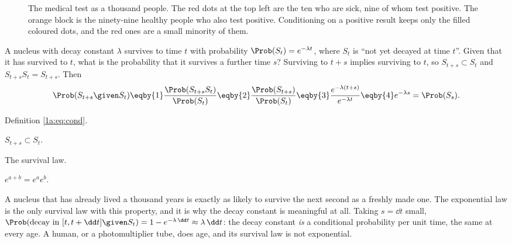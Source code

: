 \begin{figure}[htbp]
\centering
{}
\caption{The medical test as a thousand people. The red dots at the top left
are the ten who are sick, nine of whom test positive. The orange block is the
ninety-nine healthy people who also test positive. Conditioning on a positive
result keeps only the filled coloured dots, and the red ones are a small
minority of them.}
\label{1a:fig:dots}
\end{figure}

\label{1a:ex:nucleus}
A nucleus with decay constant $\lambda$ survives to time $t$ with probability
$\Prob(S_t)=e^{-\lambda t}$, where $S_t$ is ``not yet decayed at time $t$''. Given that
it has survived to $t$, what is the probability that it survives a further
time $s$? Surviving to $t+s$ implies surviving to $t$, so $S_{t+s}\subset S_t$ and
$S_{t+s}S_t=S_{t+s}$. Then
\begin{align*}
\Prob(S_{t+s}\given S_t)
\eqby{1}\frac{\Prob(S_{t+s}S_t)}{\Prob(S_t)}
\eqby{2}\frac{\Prob(S_{t+s})}{\Prob(S_t)}
\eqby{3}\frac{e^{-\lambda(t+s)}}{e^{-\lambda t}}
\eqby{4}e^{-\lambda s}=\Prob(S_s).
\end{align*}
\begin{explain}
  \item Definition \eqref{1a:eq:cond}.
  \item $S_{t+s}\subset S_t$.
  \item The survival law.
  \item $e^{a+b}=e^ae^b$.
\end{explain}
A nucleus that has already lived a thousand years is exactly as likely to
survive the next second as a freshly made one. The exponential law is the only
survival law with this  property, and it is why the decay
constant is meaningful at all. Taking $s=\dd t$ small,
$\Prob(\text{decay in }[t,t+\dd t]\given S_t)=1-e^{-\lambda\,\dd t}\approx\lambda\,\dd t$: the decay
constant \emph{is} a conditional probability per unit time, the same at every
age. A human, or a photomultiplier tube, does age, and its survival law is not
exponential.

